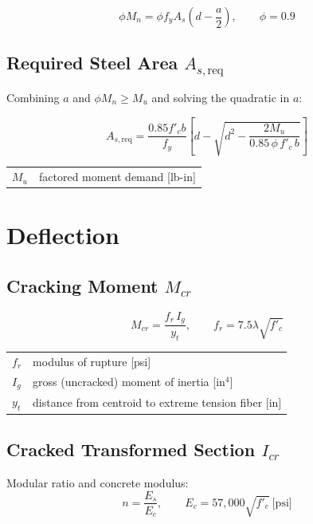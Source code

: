 \documentclass[10pt]{article}
\begin{document}
\begin{equation}
\phi M_n = \phi f_y A_s \left( d - \frac{a}{2} \right), \qquad \phi = 0.9
\end{equation}

\subsection{Required Steel Area $A_{s,\text{req}}$}

Combining $a$ and $\phi M_n \geq M_u$ and solving the quadratic in $a$:

\begin{equation}
A_{s,\text{req}} = \frac{0.85 f'_c b}{f_y} \left[ d - \sqrt{d^2 - \frac{2 M_u}{0.85\, \phi\, f'_c\, b}} \right]
\end{equation}

{\ttfamily\footnotesize
\begin{tabular}{@{}ll@{}}
$M_u$ & factored moment demand [lb-in] \\
\end{tabular}
}

\section{Deflection}

\subsection{Cracking Moment $M_{cr}$}

\begin{equation}
M_{cr} = \frac{f_r \, I_g}{y_t}, \qquad f_r = 7.5 \lambda \sqrt{f'_c}
\end{equation}

{\ttfamily\footnotesize
\begin{tabular}{@{}ll@{}}
$f_r$ & modulus of rupture [psi] \\
$I_g$ & gross (uncracked) moment of inertia [in$^4$] \\
$y_t$ & distance from centroid to extreme tension fiber [in] \\
\end{tabular}
}

\subsection{Cracked Transformed Section $I_{cr}$}

Modular ratio and concrete modulus:
\begin{equation}
n = \frac{E_s}{E_c}, \qquad E_c = 57{,}000 \sqrt{f'_c} \ \text{[psi]}
\end{equation}
\end{document}
